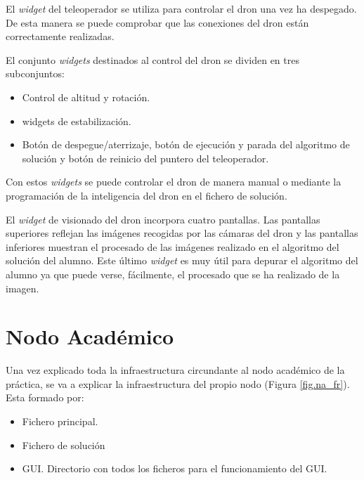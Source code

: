 El \textit{widget} del teleoperador se utiliza para controlar el dron una vez ha despegado. De esta manera se puede comprobar que las conexiones del dron están correctamente realizadas.

El conjunto \textit{widgets} destinados al control del dron se dividen en tres subconjuntos:
\begin{itemize}
    \item Control de altitud y rotación.
    \item widgets de estabilización.
    \item Botón de despegue/aterrizaje, botón de ejecución y parada del algoritmo de solución y botón de reinicio del puntero del teleoperador.
\end{itemize}
Con estos \textit{widgets} se puede controlar el dron de manera manual o mediante la programación de la inteligencia del dron en el fichero de solución.

El \textit{widget} de visionado del dron incorpora cuatro pantallas. Las pantallas superiores reflejan las imágenes recogidas por las cámaras del dron y las pantallas inferiores muestran el procesado de las imágenes realizado en el algoritmo del solución del alumno. Este último \textit{widget} es muy útil para depurar el algoritmo del alumno ya que puede verse, fácilmente, el procesado que se ha realizado de la imagen.

\section{Nodo Académico}
Una vez explicado toda la infraestructura circundante al nodo académico de la práctica, se va a explicar la infraestructura del propio nodo (Figura \ref{fig.na_fr}). Esta formado por:

\begin{itemize}
    \item Fichero principal.
    \item Fichero de solución
    \item GUI. Directorio con todos los ficheros para el funcionamiento del GUI.
\end{itemize}


